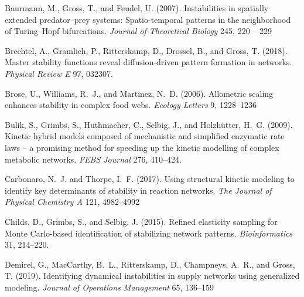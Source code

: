\documentclass{article}
\begin{document}
\begin{thebibliography}{85}
Baurmann, M., Gross, T., and Feudel, U. (2007).
\newblock Instabilities in spatially extended predator–prey systems:
  Spatio-temporal patterns in the neighborhood of Turing–Hopf bifurcations.
\newblock \emph{Journal of Theoretical Biology} 245, 220 -- 229

Brechtel, A., Gramlich, P., Ritterskamp, D., Drossel, B., and Gross, T. (2018).
\newblock Master stability functions reveal diffusion-driven pattern formation
  in networks.
\newblock \emph{Physical Review E} 97, 032307.
\newblock {}

Brose, U., Williams, R.~J., and Martinez, N.~D. (2006).
\newblock Allometric scaling enhances stability in complex food webs.
\newblock \emph{Ecology Letters} 9, 1228--1236

Bulik, S., Grimbs, S., Huthmacher, C., Selbig, J., and Holzh\"utter, H.~G.
  (2009).
\newblock Kinetic hybrid models composed of mechanistic and simplified
  enzymatic rate laws – a promising method for speeding up the kinetic
  modelling of complex metabolic networks.
\newblock \emph{FEBS Journal} 276, 410--424.
\newblock {}

Carbonaro, N.~J. and Thorpe, I.~F. (2017).
\newblock Using structural kinetic modeling to identify key determinants of
  stability in reaction networks.
\newblock \emph{The Journal of Physical Chemistry A} 121, 4982--4992

Childs, D., Grimbs, S., and Selbig, J. (2015).
\newblock Refined elasticity sampling for Monte Carlo-based identification of
  stabilizing network patterns.
\newblock \emph{Bioinformatics} 31, 214--220.
\newblock {}

Demirel, G., MacCarthy, B.~L., Ritterskamp, D., Champneys, A.~R., and Gross, T.
  (2019).
\newblock Identifying dynamical instabilities in supply networks using
  generalized modeling.
\newblock \emph{Journal of Operations Management} 65, 136--159


\end{thebibliography}
\end{document}
